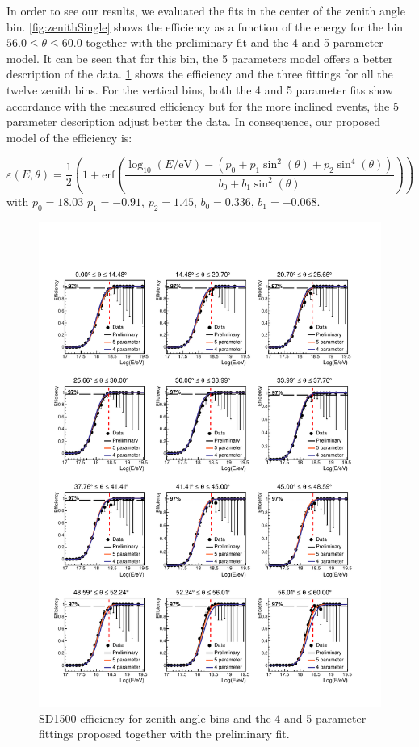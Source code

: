 \documentclass[12pt,a4paper]{article}
\begin{document}
In order to see our results, we evaluated the fits in the center of the zenith angle bin. \ref{fig:zenithSingle} shows the efficiency as a function of the energy for the bin $56.0 \leq \theta \leq 60.0$ together with the preliminary fit and the 4 and 5 parameter model. It can be seen that for this bin, the 5 parameters model offers a better description of the data. \ref{fig:zenith} shows the efficiency and the three fittings for all the twelve zenith bins. For the vertical bins, both the 4 and 5 parameter fits show accordance with the measured efficiency but for the more inclined events, the 5 parameter description adjust better the data. In consequence, our proposed model of the efficiency is:

\begin{equation}
\varepsilon(E,\theta)=\frac{1}{2}\left(1+\mathrm{erf}\left(\frac{\log_{10}(E/\mathrm{eV})-(p_0+p_1\sin^2(\theta)+p_2\sin^4(\theta))}{b_0+b_1\sin^2(\theta)}\right)\right)
\label{eqn:fitting}
\end{equation}
with $p_0=18.03$ $p_1=-0.91$, $p_2=1.45$, $b_0=0.336$, $b_1=-0.068$.

\begin{figure}[]
    \center
    \includegraphics[height=0.95\textheight]{plots/EfficiencyZenith.pdf}
    \caption{SD1500 efficiency for zenith angle bins and the 4 and 5 parameter fittings proposed together with the preliminary fit.
    \label{fig:zenith}}
\end{figure}
\end{document}
